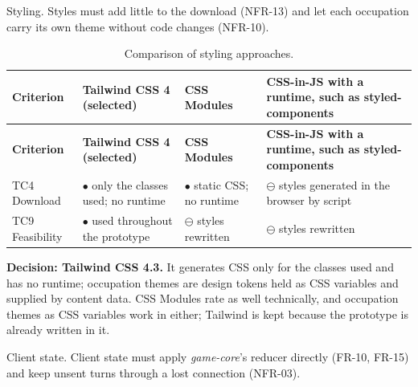 Styling. Styles must add little to the download (NFR-13) and let each occupation carry its own theme without code changes (NFR-10).

{\small
\begin{longtable}{|>{\raggedright\arraybackslash}p{}|>{\raggedright\arraybackslash}p{}|>{\raggedright\arraybackslash}p{}|>{\raggedright\arraybackslash}p{}|}
\caption{Comparison of styling approaches.} \\
\hline
\textbf{Criterion} & \textbf{Tailwind CSS 4 (selected)} & \textbf{CSS Modules\cite{r172}} & \textbf{CSS-in-JS with a runtime, such as styled-components\cite{r173}} \\ \hline
\endfirsthead
\hline
\textbf{Criterion} & \textbf{Tailwind CSS 4 (selected)} & \textbf{CSS Modules\cite{r172}} & \textbf{CSS-in-JS with a runtime, such as styled-components\cite{r173}} \\ \hline
\endhead
TC4 Download & $\bullet$ only the classes used; no runtime\cite{r141} & $\bullet$ static CSS; no runtime & $\ominus$ styles generated in the browser by script \\ \hline
TC9 Feasibility & $\bullet$ used throughout the prototype & $\ominus$ styles rewritten & $\ominus$ styles rewritten \\ \hline
\end{longtable}
}

\textbf{Decision: Tailwind CSS 4.3.} It generates CSS only for the classes used and has no runtime\cite{r141}; occupation themes are design tokens held as CSS variables and supplied by content data. CSS Modules rate as well technically, and occupation themes as CSS variables work in either; Tailwind is kept because the prototype is already written in it.

Client state. Client state must apply \textit{game-core}'s reducer directly (FR-10, FR-15) and keep unsent turns through a lost connection (NFR-03).


